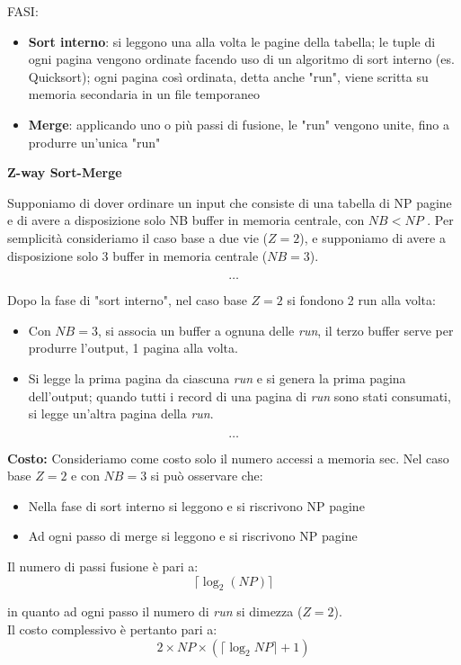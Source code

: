 \documentclass[a4paper, 10pt]{article}
\theoremstyle{definition}
\begin{document}
			FASI:
			\begin{itemize}
				\item \textbf{Sort interno}: si leggono una alla volta le pagine della
				tabella; le tuple di ogni pagina vengono ordinate facendo
				uso di un algoritmo di sort interno (es. Quicksort); ogni
				pagina così ordinata, detta anche "run", viene scritta su
				memoria secondaria in un file temporaneo
				\item \textbf{Merge}: applicando uno o più passi di fusione, le "run"
				vengono unite, fino a produrre un'unica "run"
			\end{itemize}
			\noindent
			\textbf{Z-way Sort-Merge}
			
			Supponiamo di dover ordinare un input che consiste di una
			tabella di NP pagine e di avere a disposizione solo NB buffer
			in memoria centrale, con $ NB < NP $ .
			Per semplicità consideriamo il caso base a due vie ($ Z = 2 $), e
			supponiamo di avere a disposizione solo 3 buffer in memoria
			centrale ($ NB = 3 $).
			
			\[
				\dots
			\]
						
			Dopo la fase di "sort interno", nel caso base $ Z = 2 $ si
			fondono 2 run alla volta:
			\begin{itemize}
				\item Con $ NB = 3 $, si associa un buffer a ognuna delle \textit{run},
				il terzo buffer serve per produrre l'output, 1 pagina
				alla volta.
				\item Si legge la prima pagina da ciascuna \textit{run} e si genera
				la prima pagina dell'output; quando tutti i record di
				una pagina di \textit{run} sono stati consumati, si legge
				un'altra pagina della \textit{run}.
			\end{itemize}
			
			\[
				\dots
			\]
			
			\noindent
			\textbf{Costo:}
			Consideriamo come costo solo il numero accessi a memoria sec.
			Nel caso base $ Z = 2 $ e con $ NB = 3 $ si può osservare che:
			\begin{itemize}
				\item Nella fase di sort interno si leggono e si riscrivono NP pagine
				\item Ad ogni passo di merge si leggono e si riscrivono NP pagine
			\end{itemize}
			Il numero di passi fusione è pari a:
			\[
				\lceil \log_2 (NP) \rceil  
			\]
			
			in quanto ad ogni passo il numero di \textit{run} si dimezza ($ Z = 2 $).\\
			Il costo complessivo è pertanto pari a:
			\[
				2 \times NP \times \left( \lceil \log_2 NP \rceil +1 \right)
			\]
			
\end{document}
